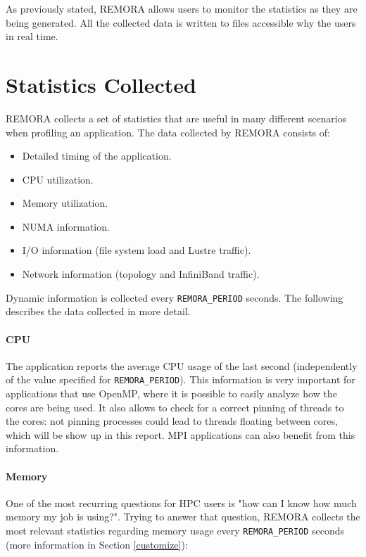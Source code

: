 \documentclass[10pt,a4paper]{report}
\begin{document}
As previously stated, REMORA allows users to monitor the statistics as they are being generated. All the collected data is written to files accessible why the users in real time.

\section{Statistics Collected}
REMORA collects a set of statistics that are useful in many different scenarios when profiling an application. The data collected by REMORA consists of:

\begin{itemize}
\item Detailed timing of the application.
\item CPU utilization.
\item Memory utilization.
\item NUMA information.
\item I/O information (file system load and Lustre traffic).
\item Network information (topology and InfiniBand traffic).
\end{itemize}

Dynamic information is collected every \texttt{REMORA\_PERIOD} seconds. The following describes the data collected in more detail. 

\paragraph{CPU}
The application reports the average CPU usage of the last second (independently of the value specified for \texttt{REMORA\_PERIOD}). This information is very important for applications that use OpenMP, where it is possible to easily analyze how the cores are being used. It also allows to check for a correct pinning of threads to the cores: not pinning processes could lead to threads floating between cores, which will be show up in this report. MPI applications can also benefit from this information.

\paragraph{Memory}
One of the most recurring questions for HPC users is "how can I know how much memory my job is using?". Trying to answer that question, REMORA collects the most relevant statistics regarding memory usage every \texttt{REMORA\_PERIOD} seconds (more information in Section \ref{customize}):
\end{document}
